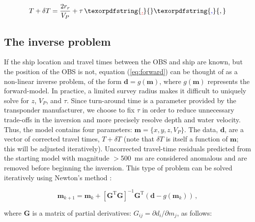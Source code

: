\documentclass[10pt,titlepage]{article}
\providecommand{\DIFaddtex}[1]{{\protect\color{blue}\uwave{#1}}} %
\providecommand{\DIFdeltex}[1]{{\protect\color{red}\sout{#1}}}                      %
\providecommand{\DIFaddbegin}{} %
\providecommand{\DIFaddend}{} %
\providecommand{\DIFdelbegin}{} %
\providecommand{\DIFdelend}{} %
\providecommand{\DIFadd}[1]{\texorpdfstring{\DIFaddtex{#1}}{#1}} %
\providecommand{\DIFdel}[1]{\texorpdfstring{\DIFdeltex{#1}}{}} %
\begin{document}
\begin{equation}
T + \delta T = \frac{2 r_r}{V_P} + \tau \,\DIFdelbegin \DIFdel{. }\DIFdelend \DIFaddbegin \DIFadd{, }\DIFaddend \label{eq:forward}
\end{equation}

\DIFaddbegin \DIFadd{where $\delta T = \delta T_{\text{dopp}} + \delta T_{\text{bend}}$.
}

\DIFaddend \subsection{The inverse problem}

If the ship location and travel times between the OBS and ship are known, but the position of the OBS is not, equation (\ref{eq:forward}) can be thought of as a non-linear inverse problem, of the form $ \mathbf{d} = g(\mathbf{m})$, where $g(\mathbf{m})$ represents the forward-model. In practice, a limited survey radius makes it difficult to uniquely solve for $z$, $V_P$, and $\tau$. Since turn-around time is a parameter provided by the transponder manufacturer, we choose to fix $\tau$ in order to reduce unnecessary trade-offs in the inversion and more precisely resolve depth and water velocity. Thus, the model contains four parameters: $\mathbf{m} = \{x,y,z,V_P\}$. The data, $\mathbf{d}$, are a vector of corrected travel times, $T+\delta T$ (note that $\delta T$ is itself a function of $\mathbf{m}$; this will be adjusted iteratively). Uncorrected travel-time residuals predicted from the starting model with magnitude $>$500~ms are considered anomalous and are removed before beginning the inversion. This type of problem can be solved iteratively using Newton's method \citep{Menke2018}:

\begin{equation}
	\mathbf{m}_{k+1} = \mathbf{m}_k + \left[\mathbf{G}^{\text{T}} \mathbf{G}\right]^{-1} \mathbf{G}^{\text{T}} \left(\mathbf{d} - g(\mathbf{m}_k)\right) \,,
\end{equation}

where $\mathbf{G}$ is a matrix of partial derivatives: $G_{ij} = \partial d_i/\partial m_j$, as follows:
\end{document}
